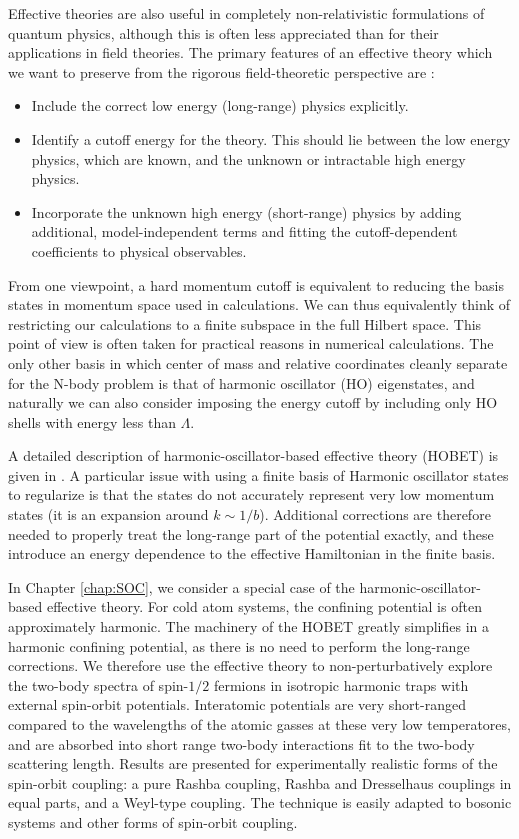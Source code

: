 Effective theories are also useful in completely non-relativistic formulations of quantum physics, although this is often less appreciated than for their applications in field theories. The primary features of an effective theory which we want to preserve from the rigorous field-theoretic perspective are \cite{Lepage:1997}:
\begin{itemize}
\item Include the correct low energy (long-range) physics explicitly. 
\item Identify a cutoff energy for the theory. This should lie between the low energy physics, which are known, and the unknown or intractable high energy physics. 
\item Incorporate the unknown high energy (short-range) physics by adding additional, model-independent terms and fitting the cutoff-dependent coefficients to physical observables.
\end{itemize}

From one viewpoint, a hard momentum cutoff is equivalent to reducing the basis states in momentum space used in calculations. We can thus equivalently think of restricting our calculations to a finite subspace in the full Hilbert space. This point of view is often taken for practical reasons in numerical calculations. The only other basis in which center of mass and relative coordinates cleanly separate for the N-body problem is that of harmonic oscillator (HO) eigenstates, and naturally we can also consider imposing the energy cutoff by including only HO shells with energy less than $\Lambda$. 

A detailed description of harmonic-oscillator-based effective theory (HOBET) is given in \cite{PhysRevC.77.034005}. A particular issue with using a finite basis of Harmonic oscillator states to regularize is that the states do not accurately represent very low momentum states (it is an expansion around $k\sim 1/b$). Additional corrections are therefore needed to properly treat the long-range part of the potential exactly, and these introduce an energy dependence to the effective Hamiltonian in the finite basis.

In Chapter \ref{chap:SOC}, we consider a special case of the harmonic-oscillator-based effective theory. For cold atom systems, the confining potential is often approximately harmonic. The machinery of the HOBET greatly simplifies in a harmonic confining potential, as there is no need to perform the long-range corrections. We therefore use the effective theory to non-perturbatively explore the two-body spectra of spin-$1/2$ fermions in isotropic harmonic traps with external spin-orbit potentials. Interatomic potentials are very short-ranged compared to the wavelengths of the atomic gasses at these very low temperatores, and are absorbed into short range two-body interactions fit to the two-body scattering length. Results are presented for experimentally realistic forms of the spin-orbit coupling: a pure Rashba coupling, Rashba and Dresselhaus couplings in equal parts, and a Weyl-type coupling. The technique is easily adapted to bosonic systems and other forms of spin-orbit coupling.